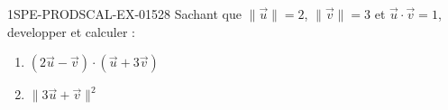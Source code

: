 \begin{exercice}{1SPE-PRODSCAL-EX-015}{2}{8}
Sachant que $\|\vec{u}\| = 2$, $\|\vec{v}\| = 3$ et $\vec{u} \cdot \vec{v} = 1$, developper et calculer :
\begin{enumerate}
  \item $(2\vec{u} - \vec{v}) \cdot (\vec{u} + 3\vec{v})$
  \item $\|3\vec{u} + \vec{v}\|^2$
\end{enumerate}
\end{exercice}
